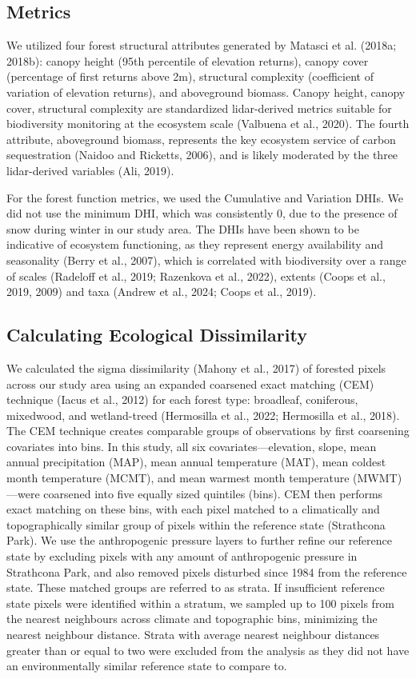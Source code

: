 \documentclass[
]{agujournal2019}
\begin{document}
\subsection{Metrics}\label{metrics}

We utilized four forest structural attributes generated by Matasci et
al. (2018a; 2018b): canopy height (95th percentile of elevation
returns), canopy cover (percentage of first returns above 2m),
structural complexity (coefficient of variation of elevation returns),
and aboveground biomass. Canopy height, canopy cover, structural
complexity are standardized lidar-derived metrics suitable for
biodiversity monitoring at the ecosystem scale (Valbuena et al., 2020).
The fourth attribute, aboveground biomass, represents the key ecosystem
service of carbon sequestration (Naidoo and Ricketts, 2006), and is
likely moderated by the three lidar-derived variables (Ali, 2019).

For the forest function metrics, we used the Cumulative and Variation
DHIs. We did not use the minimum DHI, which was consistently 0, due to
the presence of snow during winter in our study area. The DHIs have been
shown to be indicative of ecosystem functioning, as they represent
energy availability and seasonality (Berry et al., 2007), which is
correlated with biodiversity over a range of scales (Radeloff et al.,
2019; Razenkova et al., 2022), extents (Coops et al., 2019, 2009) and
taxa (Andrew et al., 2024; Coops et al., 2019).

\subsection{Calculating Ecological Dissimilarity}\label{sec-sim}

We calculated the sigma dissimilarity (Mahony et al., 2017) of forested
pixels across our study area using an expanded coarsened exact matching
(CEM) technique (Iacus et al., 2012) for each forest type: broadleaf,
coniferous, mixedwood, and wetland-treed (Hermosilla et al., 2022;
Hermosilla et al., 2018). The CEM technique creates comparable groups of
observations by first coarsening covariates into bins. In this study,
all six covariates---elevation, slope, mean annual precipitation (MAP),
mean annual temperature (MAT), mean coldest month temperature (MCMT),
and mean warmest month temperature (MWMT)---were coarsened into five
equally sized quintiles (bins). CEM then performs exact matching on
these bins, with each pixel matched to a climatically and
topographically similar group of pixels within the reference state
(Strathcona Park). We use the anthropogenic pressure layers to further
refine our reference state by excluding pixels with any amount of
anthropogenic pressure in Strathcona Park, and also removed pixels
disturbed since 1984 from the reference state. These matched groups are
referred to as strata. If insufficient reference state pixels were
identified within a stratum, we sampled up to 100 pixels from the
nearest neighbours across climate and topographic bins, minimizing the
nearest neighbour distance. Strata with average nearest neighbour
distances greater than or equal to two were excluded from the analysis
as they did not have an environmentally similar reference state to
compare to.
\end{document}
